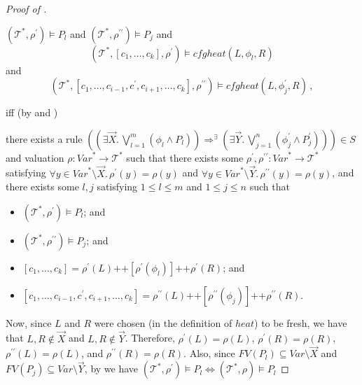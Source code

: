 \documentclass{article}
\newenvironment{proofenv}
  {
    \VerbatimEnvironment\begin{tcolorbox}[colback=black!0!white] %
  }
  {
   \end{tcolorbox}
  }
\begin{document}
\begin{proof}[Proof of ]
\begin{proofenv}
$(\mathcal{T}^*, \rho^\prime) \vDash P_l$ and $(\mathcal{T}^*, \rho^{\prime\prime}) \vDash P_j$ and
\begin{equation*}
    (\mathcal{T}^*, [c_1,\ldots,c_k], \rho^\prime) \vDash \mathit{cfgheat}(L, \phi_l, R)
\end{equation*}
and
\begin{equation*}
    (\mathcal{T}^*, [c_1, \ldots, c_{i-1}, c^\prime, c_{i+1}, \ldots, c_k], \rho^{\prime\prime}) \vDash
    \mathit{cfgheat}(L, \phi^\prime_j, R) \, ,
\end{equation*}
\end{proofenv}
iff (by  and )
\begin{proofenv}
there exists a rule $((\exists \vec{X}.\, \bigvee_{l=1}^{m} (\phi_l \land P_l)) \Rightarrow^\exists (\exists \vec{Y}.\, \bigvee_{j=1}^{n} (\phi^\prime_j \land P^\prime_j))) \in S$
and valuation $\rho : \mathit{Var}^* \to \mathcal{T}^*$ such that
there exists some $\rho^\prime,\rho^{\prime\prime} : \mathit{Var}^* \to \mathcal{T}^*$
satisfying $\forall y \in \mathit{Var}^* \setminus \vec{X}.\, \rho^\prime(y) = \rho(y)$
and $\forall y \in \mathit{Var}^* \setminus \vec{Y}.\, \rho^{\prime\prime}(y) = \rho(y)$,
and there exists some $l,j$ satisfying $1 \leq l \leq m$ and $1 \leq j \leq n$ such that
\begin{itemize}
    \item $(\mathcal{T}^*, \rho^\prime) \vDash P_l$; and
    \item $(\mathcal{T}^*, \rho^{\prime\prime}) \vDash P_j$; and
    \item $[c_1,\ldots,c_k] = \rho^\prime(L) \texttt{++} [\rho^\prime(\phi_l)] \texttt{++} \rho^\prime(R)$; and
    \item $[c_1, \ldots, c_{i-1}, c^\prime, c_{i+1}, \ldots, c_k] = \rho^{\prime\prime}(L)
    \texttt{++} [\rho^{\prime\prime}(\phi_j)] \texttt{++} \rho^{\prime\prime}(R)$.
\end{itemize}
\end{proofenv}
Now, since $L$ and $R$ were chosen (in the definition of $\mathit{heat}$) to be fresh, we have that
$L,R \not\in \vec{X}$ and $L,R \not\in \vec{Y}$. Therefore,
$\rho^\prime(L) = \rho(L)$, $\rho^\prime(R) = \rho(R)$,
$\rho^{\prime\prime}(L) = \rho(L)$, and $\rho^{\prime\prime}(R) = \rho(R)$.
Also, since $\mathit{FV}(P_l) \subseteq \mathit{Var} \setminus \vec{X}$
and $\mathit{FV}(P_j) \subseteq \mathit{Var} \setminus \vec{Y}$,
by  we have $(\mathcal{T}^*, \rho^\prime) \vDash P_l \iff (\mathcal{T}^*, \rho) \vDash P_l$

\end{proof}
\end{document}
